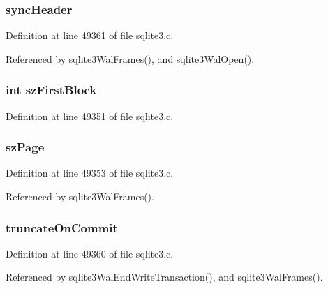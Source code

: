\subsubsection[{sync\+Header}]{ sync\+Header}\label{struct_wal_a79658a9018249026bc019cb526820709}


Definition at line 49361 of file sqlite3.\+c.



Referenced by sqlite3\+Wal\+Frames(), and sqlite3\+Wal\+Open().

\hypertarget{struct_wal_ace35af8f2d47788c9995a1561f4829d8}{}
\subsubsection[{sz\+First\+Block}]{\setlength{\rightskip}{0pt plus 5cm}int sz\+First\+Block}\label{struct_wal_ace35af8f2d47788c9995a1561f4829d8}


Definition at line 49351 of file sqlite3.\+c.

\hypertarget{struct_wal_a24f238e67ca9d783c8e9c89ba9003659}{}
\subsubsection[{sz\+Page}]{ sz\+Page}\label{struct_wal_a24f238e67ca9d783c8e9c89ba9003659}


Definition at line 49353 of file sqlite3.\+c.



Referenced by sqlite3\+Wal\+Frames().

\hypertarget{struct_wal_ac1c71bec4181078ec81e31c8f50cbf60}{}
\subsubsection[{truncate\+On\+Commit}]{ truncate\+On\+Commit}\label{struct_wal_ac1c71bec4181078ec81e31c8f50cbf60}


Definition at line 49360 of file sqlite3.\+c.



Referenced by sqlite3\+Wal\+End\+Write\+Transaction(), and sqlite3\+Wal\+Frames().

